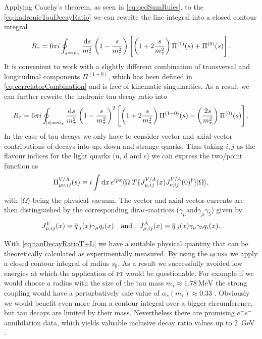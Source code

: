 \documentclass[../../index.tex]{subfiles}
\begin{document}
Applying Cauchy's theorem, as seen in \cref{eq:qcdSumRules}, to the
\cref{eq:hadronicTauDecayRatio} we can rewrite the line integral into a closed
contour integral
\begin{equation}
  \label{eq:rTauT+L}
  R_\tau = 6 \pi i \oint_{s=m_\tau} \frac{\dif s}{m_\tau^2}
  \left( 1 - \frac{s}{m_\tau^2} \right)
  \left[ \left( 1 + 2 \frac{s}{m_\tau^2} \right) \Pi^{(1)}(s) + \Pi^{(0)}(s) \right].
\end{equation}
It is convenient to work with a slightly different combination of transversal
and longitudinal components \(\Pi^{(1+0)}\), which has been defined in
\cref{eq:correlatorCombination} and is free of kinematic singularities. As a
result we can further rewrite the hadronic tau decay ratio into
\begin{equation}
  \label{eq:tauDecayRatioT+L}
  R_\tau = 6 \pi i \oint_{\abs{s}=m_\tau} \frac{\dif s}{m_\tau^2}
  \left( 1 - \frac{s}{m_\tau^2} \right)^2
  \left[ \left( 1 + 2 \frac{s}{m_\tau^2} \right) \Pi^{(1+0)}(s) - \left( \frac{2 s}{m_\tau^2} \right) \Pi^{(0)}(s) \right].
\end{equation}
In the case of tau decays we only have to consider vector and axial-vector
contributions of decays into up, down and strange quarks. Thus taking $i,j$ as
the flavour indices for the light quarks (u, d and s) we can express the
two\-/point function as
\begin{equation}
  \Pi_{\mu\nu,ij}^{V/A}(s) \equiv i \int \dif x \,e^{ipx} \langle \Omega | T \{ J_{\mu,ij}^{V/A}(x) J_{\nu,ij}^{V/A}(0)^\dagger \} | \Omega \rangle,
\end{equation}
with $|\Omega\rangle$ being the physical vacuum. The vector and axial-vector
currents are then distinguished by the corresponding dirac-matrices ($\gamma_\mu
\text{and} \gamma_\mu \gamma_5$) given by
\begin{equation}
  J_{\mu,ij}^{V}(x) = \overline{q}\,_j(x) \gamma_\mu q_i(x) \quad \text{and} \quad J_{\mu,ij}^{A}(x) = \overline{q}\,_j(x) \gamma_\mu \gamma_5 q_i(x).
\end{equation}

With \cref{eq:tauDecayRatioT+L} we have a suitable physical quantity that can be
theoretically calculated as experimentally measured. By using the \textsc{qcdsr}
we apply a closed contour integral of radius \(s_0\). As a result we
successfully avoided low energies at which the application of \textsc{pt} would
be questionable. For example if we would choose a radius with the size of the
tau mass \(m_\tau \approx \SI{1.78}{\mega\eV}\) the strong coupling would have a
perturbatively safe value of \(\alpha_s(m_\tau)\approx 0.33\) \cite{Pich2016}.
Obviously we would benefit even more from a contour integral over a bigger
circumference, but tau decays are limited by their mass. Nevertheless there are
promising \(e^+e^-\) annihilation data, which yields valuable inclusive decay ratio values up to
\SI{2}{\giga\eV} \cite{Boito2018}\cite{Keshavarzi2018}.
\end{document}

